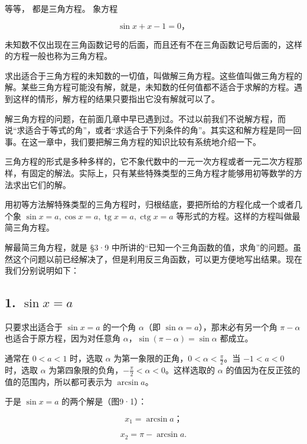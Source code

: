 等等， 都是三角方程。 象方程

\[
\sin x + x - 1 = 0\text{，}
\]

未知数不仅出现在三角函数记号的后面，而且还有不在三角函数记号后面的，这样的方程一般也称为三角方程。

求出适合于三角方程的未知数的一切值，叫做解三角方程。这些值叫做三角方程的解。某些三角方程可能没有解，就是，未知数的任何值都不适合于求解的方程。遇到这样的情形，解方程的结果只要指出它没有解就可以了。

解三角方程的问题，在前面几章中早已遇到过。不过以前我们不说解方程，而说``求适合于等式的角''，或者``求适合于下列条件的角''。其实这和解方程是同一回事。在这一章中，我们要把解三角方程的知识比较有系统地介绍一下。

三角方程的形式是多种多样的，它不象代数中的一元一次方程或者一元二次方程那样，有固定的解法。实际上，只有某些特殊类型的三角方程才能够用初等数学的方法求出它们的解。

用初等方法解特殊类型的三角方程时，归根结底，要把所给的方程化成一个或者几个象
\(\sin x = a, \cos x = a, \operatorname{tg} x = a, \operatorname{ctg} x = a\)
等形式的方程。这样的方程叫做最简三角方程。

解最简三角方程，就是 §3·9
中所讲的``已知一个三角函数的值，求角''的问题。虽然这个问题以前已经解决了，但是利用反三角函数，可以更方便地写出结果。现在我们分别说明如下：

\subsection{\texorpdfstring{1. \(\sin x = a\)}{1. \textbackslash sin x = a}}\label{sin-x-a}

只要求出适合于 \(\sin x=a\) 的一个角 \(\alpha\)（即
\(\sin\alpha=a\)），那末必有另一个角 \(\pi-\alpha\)
也适合于原方程，因为对任意角 \(\alpha\)，\(\sin(\pi-\alpha)=\sin\alpha\)
都成立。

通常在 \(0 < a < 1\) 时，选取 \(\alpha\)
为第一象限的正角，\(0 < \alpha < \frac{\pi}{2}\)。当 \(-1 < a < 0\)
时，选取 \(\alpha\)
为第四象限的负角，\(-\frac{\pi}{2}<\alpha<0\)。这样选取的 \(\alpha\)
的值因为在反正弦的值的范围内，所以都可表示为 \(\arcsin a\)。

于是 \(\sin x = a\) 的两个解是（图9·1）：

\[
x _ {1} = \arcsin a\text{；}
\]

\[
x _ {2} = \pi - \arcsin a.
\]

